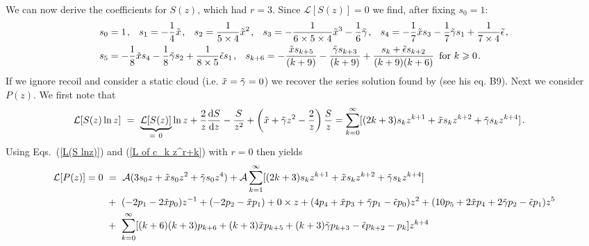 \documentclass[fleqn,usenatbib]{mnras}
\begin{document}
We can now derive the coefficients for $S(z)$, which had $r = 3$. Since $\mathcal{L} [S(z)] = 0$ we find, after fixing $s_0 = 1$:
\begin{align}
    s_0 &= 1 \hspace{1 pt}, \hspace{8 pt} s_1 = - \dfrac{1}{4} \Tilde{x} \hspace{1 pt}, \hspace{8 pt} s_2 = \dfrac{1}{5\times 4} \Tilde{x}^2 \hspace{1 pt}, \hspace{8 pt}  s_3 = - \dfrac{1}{6 \times 5 \times 4} \Tilde{x}^3 - \dfrac{1}{6} \Tilde{\gamma}  \hspace{1 pt}, \hspace{8 pt} s_4 = - \dfrac{1}{7}\Tilde{x} s_3 -\dfrac{1}{7} \Tilde{\gamma} s_1 + \dfrac{1}{7 \times 4} \Tilde{\epsilon} \hspace{1 pt} , \nonumber \\ s_5 &= - \dfrac{1}{8} \Tilde{x} s_4 - \dfrac{1}{8} \Tilde{\gamma} s_2 + \dfrac{1}{8 \times 5} \Tilde{\epsilon} s_1 \hspace{1 pt} , \hspace{8 pt} s_{k+6} = - \dfrac{\Tilde{x} s_{k+5}}{(k+9)} - \dfrac{\Tilde{\gamma} s_{k+3}}{(k+9)}  + \dfrac{s_k + \Tilde{\epsilon} s_{k+2}}{(k+9)(k+6)} \hspace{5 pt} \textrm{for }k \geq 0 \hspace{1 pt}.  \label{s_k coeffs}
\end{align}
If we ignore recoil and consider a static cloud (i.e. $\Tilde{x} = \Tilde{\gamma} = 0$) we recover the series solution found by \cite{Neufeld1990} (see his eq. B9). Next we consider $P(z)$. We first note that
\begin{align}
    \mathcal{L}[S(z) \ln z] ~&=~ \underbrace{\mathcal{L}[S(z)]}_{= ~0}  \ln z  + \dfrac{2}{z} \dfrac{\textrm{d}S}{\textrm{d}z} - \dfrac{S}{z^2} + \left( \Tilde{x} + \Tilde{\gamma}z^2 - \dfrac{2}{z} \right) \dfrac{S}{z}  =   \sum_{k=0}^{\infty} [(2k+3)s_kz^{k+1} + \Tilde{x} s_k z^{k+2} + \Tilde{\gamma} s_k z^{k+4}] \hspace{1 pt} \label{L(S lnz)}.
\end{align}
Using Eqs.~(\ref{L(S lnz)}) and (\ref{L of c_k z^r+k}) with $r=0$ then yields
\begin{align}
    \mathcal{L}[P(z)] = 0 ~&=~ \mathcal{A} (3 s_0 z + \Tilde{x} s_0 z^2 + \Tilde{\gamma} s_0 z^4) + \mathcal{A} \sum_{k=1}^{\infty} [(2k+3)s_kz^{k+1} + \Tilde{x} s_k z^{k+2} + \Tilde{\gamma} s_k z^{k+4}] \nonumber \\ &+~ (-2p_1 - 2\Tilde{x}p_0) z^{-1} + (-2p_2 - \Tilde{x}p_1) + 0 \times z + (4 p_4 + \Tilde{x}p_3 + \Tilde{\gamma}p_1 - \Tilde{\epsilon} p_0) z^2 + (10 p_5 + 2\Tilde{x}p_4 + 2\Tilde{\gamma}p_2 - \Tilde{\epsilon} p_1) z^5 \nonumber \\ ~&+~ \sum_{k=0}^{\infty} [(k+6)(k+3)p_{k+6} + (k+3) \Tilde{x} p_{k+5} + (k+3)\Tilde{\gamma}p_{k+3} - \Tilde{\epsilon} p_{k+2} - p_k] z^{k+4}
\end{align}
\end{document}
